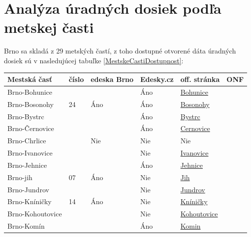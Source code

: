 \section{Analýza úradných dosiek podľa metskej časti}

Brno sa skladá z 29 metských častí, z toho dostupné otvorené dáta úradných dosiek sú v nasledujúcej tabuľke \ref{MestskeCastiDostupnost}:

\begin{table}[H]
    \centering
    \begin{tabular}{|l|l|l|l|l|l|}
    \hline
        Mestská časť & číslo & edeska Brno  & Edesky.cz & off. stránka  &  ONF \\ \hline
        Brno-Bohunice & & & \color{green}Áno & \href{https://www.brno-bohunice.cz/cs/urad-mestske-casti/uredni-deska.html}{Bohunice} & ~ \\ \hline
        Brno-Bosonohy & 24 & \color{green}Áno & \color{green}Áno & \href{https://edeska.brno.cz/eDeska24/}{Bosonohy} & ~ \\ \hline
        Brno-Bystrc & & & \color{green}Áno & \href{https://www.bystrc.cz/uredni-deska.html}{Bystrc} & ~\\ \hline
        Brno-Černovice & & & \color{green}Áno& \href{https://www.cernov.cz/vismo/zobraz_dok.asp?id\_org=2052&id\_ktg=1003}{Cernovice}  & ~ \\ \hline
        Brno-Chrlice & & \color{red}Nie& \color{red}Nie & \color{red}Nie & ~ \\ \hline
        Brno-Ivanovice & & & \color{red}Nie& \href{https://www.mcivanovice.cz/uredni-deska}{Ivanovice}& ~ \\ \hline
        Brno-Jehnice & & & \color{green}Áno & \href{http://brno-jehnice.cz/uredni-deska}{Jehnice}& ~ \\ \hline
        Brno-jih & 07 & \color{green}Áno & \color{red}Nie & \href{https://www.brno-jih.cz/uredni-deska/1}{Jih} & ~ \\ \hline
        Brno-Jundrov & & & \color{red}Nie& \href{https://www.jundrov.info/uredni-deska/2}{Jundrov} & ~ \\ \hline
        Brno-Kníničky & 14 & \color{green}Áno & \color{red}Nie & \href{https://edeska.brno.cz/eDeska14/}{Kníničky} &  ~ \\ \hline
        Brno-Kohoutovice & & & \color{red}Nie & \href{https://www.kohoutovice.brno.cz/uredni-deska/2}{Kohoutovice} & ~ \\ \hline
        Brno-Komín & & & \color{green}Áno & \href{https://www.brno-komin.cz/uredni-deska}{Komin}& ~ \\ \hline

\end{tabular}
\end{table}
